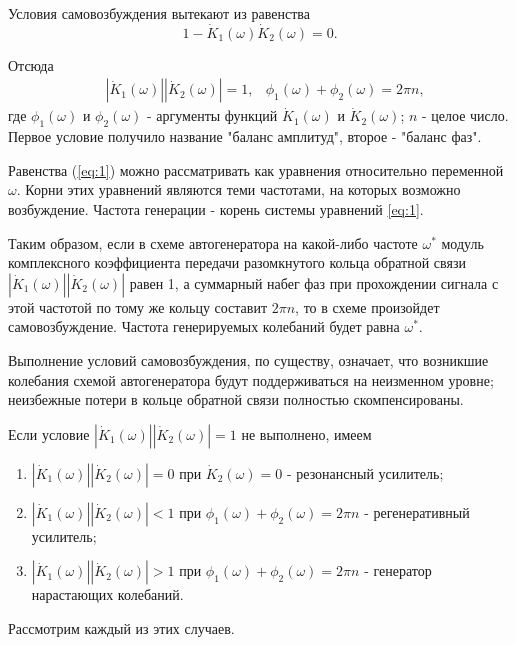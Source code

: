 Условия самовозбуждения вытекают из равенства
\begin{equation*}
1-\dot{K}_1(\omega)\dot{K}_2(\omega)=0.
\end{equation*}

Отсюда 
\begin{equation}
\begin{aligned}
& |\dot{K}_1(\omega)||\dot{K}_2(\omega)|=1, & \phi_1(\omega)+\phi_2(\omega)=2\pi n,
\end{aligned}
\label{eq:1}
\end{equation}
где $\phi_1(\omega)$ и $\phi_2(\omega)$ - аргументы функций $\dot{K}_1(\omega)$ и $\dot{K}_2(\omega)$; $n$ - целое число. Первое условие получило название "баланс амплитуд", второе - "баланс фаз".

Равенства (\ref{eq:1}) можно рассматривать как уравнения относительно переменной $\omega$. Корни этих уравнений являются теми частотами, на которых возможно возбуждение. Частота генерации - корень системы уравнений \eqref{eq:1}.

Таким образом, если в схеме автогенератора на какой-либо частоте $\omega^*$ модуль комплексного коэффициента передачи разомкнутого кольца обратной связи $|\dot{K}_1(\omega)||\dot{K}_2(\omega)|$ равен 1, а суммарный набег фаз при прохождении сигнала с этой частотой по тому же кольцу составит $2\pi n$, то в схеме произойдет самовозбуждение. Частота генерируемых колебаний будет равна $\omega^*$.

Выполнение условий самовозбуждения, по существу, означает, что возникшие колебания схемой автогенератора будут поддерживаться на неизменном уровне; неизбежные потери в кольце обратной связи полностью скомпенсированы.

Если условие $|\dot{K}_1(\omega)||\dot{K}_2(\omega)|=1$ не выполнено, имеем
\begin{enumerate}
\item {
	$|\dot{K}_1(\omega)||\dot{K}_2(\omega)|=0$ при $\dot{K}_2(\omega)=0$ - резонансный усилитель;
}
\item {
	$|\dot{K}_1(\omega)||\dot{K}_2(\omega)|<1$ при $\phi_1(\omega)+\phi_2(\omega)=2\pi n$ - регенеративный усилитель;
}
\item {
	$|\dot{K}_1(\omega)||\dot{K}_2(\omega)|>1$ при $\phi_1(\omega)+\phi_2(\omega)=2\pi n$ - генератор нарастающих колебаний.
}
\end{enumerate}
Рассмотрим каждый из этих случаев.

